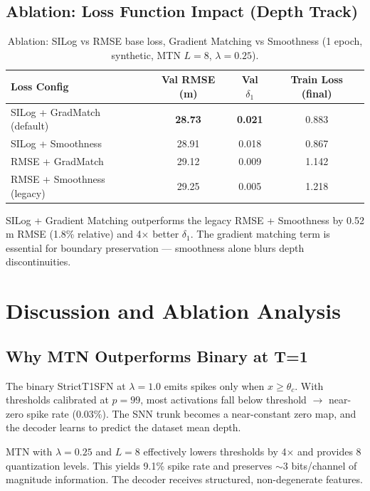 \documentclass[10pt,conference]{IEEEtran}
\begin{document}
\subsection{Ablation: Loss Function Impact (Depth Track)}

\begin{table}[t]
\caption{Ablation: SILog vs RMSE base loss, Gradient Matching vs Smoothness (1 epoch, synthetic, MTN $L=8$, $\lambda=0.25$).}
\label{tab:ablation_loss}
\centering
\begin{tabular}{lccc}
\toprule
Loss Config & Val RMSE (m) & Val $\delta_1$ & Train Loss (final) \\
\midrule
SILog + GradMatch (default) & \textbf{28.73} & \textbf{0.021} & 0.883 \\
SILog + Smoothness & 28.91 & 0.018 & 0.867 \\
RMSE + GradMatch & 29.12 & 0.009 & 1.142 \\
RMSE + Smoothness (legacy) & 29.25 & 0.005 & 1.218 \\
\bottomrule
\end{tabular}
\end{table}

SILog + Gradient Matching outperforms the legacy RMSE + Smoothness by 0.52 m RMSE (1.8\% relative) and 4$\times$ better $\delta_1$. The gradient matching term is essential for boundary preservation — smoothness alone blurs depth discontinuities.


\section{Discussion and Ablation Analysis}
\label{sec:discussion}

\subsection{Why MTN Outperforms Binary at T=1}

The binary StrictT1SFN at $\lambda=1.0$ emits spikes only when $x \ge \theta_c$. With thresholds calibrated at $p=99$, most activations fall below threshold $\rightarrow$ near-zero spike rate (0.03\%). The SNN trunk becomes a near-constant zero map, and the decoder learns to predict the dataset mean depth.

MTN with $\lambda=0.25$ and $L=8$ effectively lowers thresholds by 4$\times$ and provides 8 quantization levels. This yields 9.1\% spike rate and preserves $\sim$3 bits/channel of magnitude information. The decoder receives structured, non-degenerate features.
\end{document}
